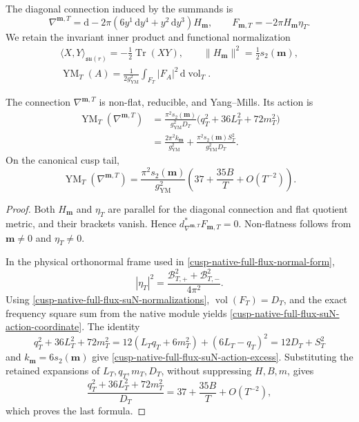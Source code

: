 The diagonal connection induced by the summands is
\begin{equation}
 \nabla^{\mathbf m,T}
 =\mathrm d-2\pi(6y^1\,\mathrm dy^4+y^2\,\mathrm dy^3)H_{\mathbf m},
 \qquad
 F_{\mathbf m,T}=-2\pi H_{\mathbf m}\eta_T.
 \label{cusp-native-full-flux-suN-connection-curvature}
\end{equation}
We retain the invariant inner product and functional normalization
\begin{equation}
 \begin{gathered}
  \langle X,Y\rangle_{\mathfrak{su}(r)}
  =-\frac12\operatorname{Tr}(XY),
  \qquad
  \lVert H_{\mathbf m}\rVert^2=\frac12s_2(\mathbf m),\\
  \operatorname{YM}_T(A)=\frac1{2g_{\mathrm{YM}}^2}
  \int_{F_T}|F_A|^2\,\mathrm d\operatorname{vol}_T.
 \end{gathered}
 \label{cusp-native-full-flux-suN-normalizations}
\end{equation}

\begin{theorem}
\label{cusp-native-full-flux-suN-action-theorem}
The connection \(\nabla^{\mathbf m,T}\) is non-flat, reducible, and
Yang--Mills.  Its action is
\begin{align}
 \operatorname{YM}_T(\nabla^{\mathbf m,T})
 &=\frac{\pi^2s_2(\mathbf m)}{g_{\mathrm{YM}}^2D_T}
   \bigl(q_T^2+36L_T^2+72m_T^2\bigr)
 \label{cusp-native-full-flux-suN-action-coordinate}\\
 &=\frac{2\pi^2k_{\mathbf m}}{g_{\mathrm{YM}}^2}
   +\frac{\pi^2s_2(\mathbf m)S_T^2}
          {g_{\mathrm{YM}}^2D_T}.
 \label{cusp-native-full-flux-suN-action-excess}
\end{align}
On the canonical cusp tail,
\begin{equation}
 \operatorname{YM}_T(\nabla^{\mathbf m,T})
 =\frac{\pi^2s_2(\mathbf m)}{g_{\mathrm{YM}}^2}
 \left(37+\frac{35B}{T}+O(T^{-2})\right).
 \label{cusp-native-full-flux-suN-action-asymptotic}
\end{equation}
\end{theorem}

\begin{proof}
Both \(H_{\mathbf m}\) and \(\eta_T\) are parallel for the diagonal
connection and flat quotient metric, and their brackets vanish.  Hence
\(d_{\nabla^{\mathbf m,T}}^*F_{\mathbf m,T}=0\).  Non-flatness follows
from \(\mathbf m\ne0\) and \(\eta_T\ne0\).

In the physical orthonormal frame used in
\cref{cusp-native-full-flux-normal-form},
\[
 |\eta_T|^2
 =\frac{\mathcal B_{T,+}^2+\mathcal B_{T,-}^2}{4\pi^2}.
\]
Using \cref{cusp-native-full-flux-suN-normalizations},
\(\operatorname{vol}(F_T)=D_T\), and the exact frequency square sum from
the native module yields
\cref{cusp-native-full-flux-suN-action-coordinate}.  The identity
\[
 q_T^2+36L_T^2+72m_T^2
 =12(L_T q_T+6m_T^2)+(6L_T-q_T)^2
 =12D_T+S_T^2
\]
and \(k_{\mathbf m}=6s_2(\mathbf m)\) give
\cref{cusp-native-full-flux-suN-action-excess}.  Substituting the retained
expansions of \(L_T,q_T,m_T,D_T\), without suppressing \(H,B,m\), gives
\[
 \frac{q_T^2+36L_T^2+72m_T^2}{D_T}
 =37+\frac{35B}{T}+O(T^{-2}),
\]
which proves the last formula.
\end{proof}

